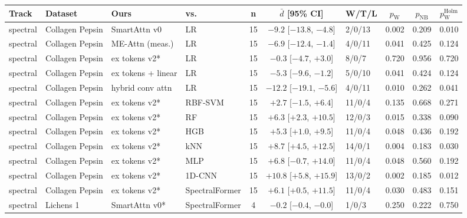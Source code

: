 \small
\begin{tabular}{llllcclccc}
\toprule
Track & Dataset & Ours & vs. & n & $\bar d$ [95\% CI] & W/T/L & $p_{\mathrm{W}}$ & $p_{\mathrm{NB}}$ & $p_{\mathrm{W}}^{\mathrm{Holm}}$ \\
\midrule
spectral & Collagen Pepsin & SmartAttn v0 & LR & 15 & $-9.2$ [$-13.8$, $-4.8$] & 2/0/13 & 0.002 & 0.209 & 0.010 \\
spectral & Collagen Pepsin & ME-Attn (meas.) & LR & 15 & $-6.9$ [$-12.4$, $-1.4$] & 4/0/11 & 0.041 & 0.425 & 0.124 \\
spectral & Collagen Pepsin & ex tokens v2* & LR & 15 & $-0.3$ [$-4.7$, $+3.0$] & 8/0/7 & 0.720 & 0.956 & 0.720 \\
spectral & Collagen Pepsin & ex tokens + linear & LR & 15 & $-5.3$ [$-9.6$, $-1.2$] & 5/0/10 & 0.041 & 0.424 & 0.124 \\
spectral & Collagen Pepsin & hybrid conv attn & LR & 15 & $-12.2$ [$-19.1$, $-5.6$] & 4/0/11 & 0.010 & 0.262 & 0.041 \\
spectral & Collagen Pepsin & ex tokens v2* & RBF-SVM & 15 & $+2.7$ [$-1.5$, $+6.4$] & 11/0/4 & 0.135 & 0.668 & 0.271 \\
spectral & Collagen Pepsin & ex tokens v2* & RF & 15 & $+6.3$ [$+2.3$, $+10.5$] & 12/0/3 & 0.015 & 0.338 & 0.090 \\
spectral & Collagen Pepsin & ex tokens v2* & HGB & 15 & $+5.3$ [$+1.0$, $+9.5$] & 11/0/4 & 0.048 & 0.436 & 0.192 \\
spectral & Collagen Pepsin & ex tokens v2* & kNN & 15 & $+8.7$ [$+4.5$, $+12.5$] & 14/0/1 & 0.004 & 0.183 & 0.030 \\
spectral & Collagen Pepsin & ex tokens v2* & MLP & 15 & $+6.8$ [$-0.7$, $+14.0$] & 11/0/4 & 0.048 & 0.560 & 0.192 \\
spectral & Collagen Pepsin & ex tokens v2* & 1D-CNN & 15 & $+10.8$ [$+5.8$, $+15.9$] & 13/0/2 & 0.002 & 0.185 & 0.012 \\
spectral & Collagen Pepsin & ex tokens v2* & SpectralFormer & 15 & $+6.1$ [$+0.5$, $+11.5$] & 11/0/4 & 0.030 & 0.483 & 0.151 \\
\midrule
spectral & Lichens 1 & SmartAttn v0* & SpectralFormer & 4 & $-0.2$ [$-0.4$, $-0.0$] & 1/0/3 & 0.250 & 0.222 & 0.750 \\

\end{tabular}
